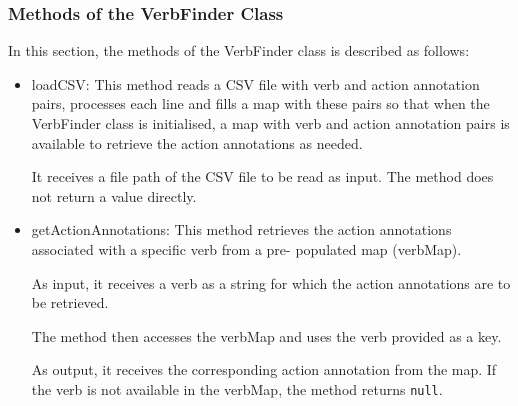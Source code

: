 \subsubsection*{Methods of the VerbFinder Class}
In this section, the methods of the VerbFinder class is described as follows:
\begin{itemize}	
	\item loadCSV: This method reads a CSV file with verb and action annotation pairs, processes each line and fills a map with these pairs so that when the VerbFinder class is initialised, a map with verb and action annotation pairs is available to retrieve the action annotations as needed.
	
	It receives a file path of the CSV file to be read as input. The method does not return a value directly.
	
	\item getActionAnnotations: This method retrieves the action annotations associated with a specific verb from a pre- populated map (verbMap).
	
	As input, it receives a verb as a string for which the action annotations are to be retrieved.
	
	The method then accesses the verbMap and uses the verb provided as a key.
	
	As output, it receives the corresponding action annotation from the map. If the verb is not available in the verbMap, the method returns \texttt{null}.
	
\end{itemize}
